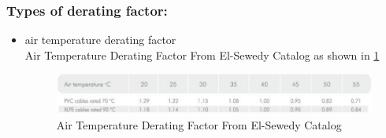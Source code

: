 \documentclass[12pt,fleqn]{book} %
\begin{document}
    \subsubsection{  Types of derating factor:}
    \begin{itemize}
    \item 	air temperature derating factor 
    \\ Air Temperature Derating Factor From El-Sewedy Catalog as shown in \ref{fig:yousef 3}
     \begin{figure}[h!]
    \centering
    \includegraphics[width=0.8\linewidth]{yousef 3.png}
    \caption{ Air Temperature Derating Factor From El-Sewedy Catalog}
    \label{fig:yousef 3}
\end{figure}


\end{itemize}
\end{document}
